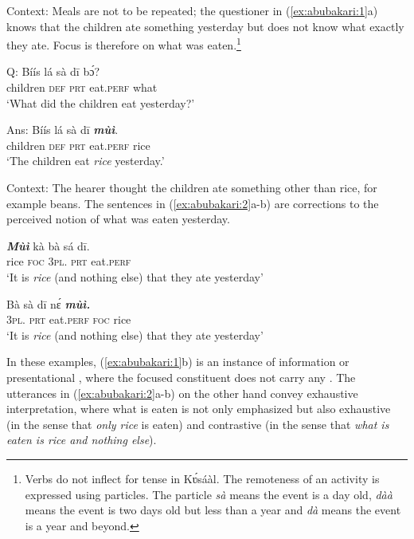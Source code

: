 \documentclass[output=paper
,newtxmath
,modfonts
,nonflat]{langsci/langscibook}
\begin{document}
Context: Meals are not to be repeated; the questioner in (\ref{ex:abubakari:1}a) knows that the children ate something yesterday but does not know what exactly they ate. Focus is therefore on what was eaten.\footnote{Verbs do not inflect for tense in Kʋ́sáàl. The remoteness of an activity is expressed using particles. The particle \textit{sà} means the event is a day old, \textit{dàà} means the event is two days old but less than a year and \textit{dà} means the event is a year and beyond.}

 
\ea\label{ex:abubakari:1}
\ea\label{ex:abubakari:1a}
Q: \gll Bíís    lá  sà dī    bɔ́?\\                 
children  \textsc{def}  \textsc{prt}  eat.\textsc{perf}  what\\                     
\glt ‘What did the children eat yesterday?’    

\ex\label{ex:abubakari:1b}
Ans: \gll Bíís    lá  sà  dī \textbf{\textit{mùì}}.\\
children    \textsc{def}  \textsc{prt}  eat.\textsc{perf}  rice\\
\glt ‘The children eat \textit{rice} yesterday.’  
 \z
 \z
 
Context: The hearer thought the children ate something other than rice, for example beans. The sentences in (\ref{ex:abubakari:2}a-b) are corrections to the perceived notion of what was eaten yesterday. 
 
 
\ea\label{ex:abubakari:2}
\ea\label{ex:abubakari:2a}
\gll \textbf{\textit{Mùì} }kà  bà  sá  dī.  \\ 
rice  \textsc{foc}  3\textsc{pl}.  \textsc{prt}  eat.\textsc{perf}   \\                  
\glt ‘It is \textit{rice} (and nothing else) that they ate yesterday’    

\ex\label{ex:abubakari:2b}
\gll Bà  sà  dī    nɛ́ \textbf{\textit{mùì.}}\\
3\textsc{pl}.  \textsc{prt}  eat.\textsc{perf}  \textsc{foc}  rice\\
\glt ‘It is \textit{rice} (and nothing else) that they ate yesterday’
\z
\z

In these examples, (\ref{ex:abubakari:1}b) is an instance of information or presentational , where the focused constituent does not carry any . The utterances in (\ref{ex:abubakari:2}a-b) on the other hand convey exhaustive interpretation, where what is eaten is not only emphasized but also exhaustive (in the sense that \textit{only rice} is eaten) and contrastive (in the sense that \textit{what is eaten is rice and nothing else}). 
\end{document}
